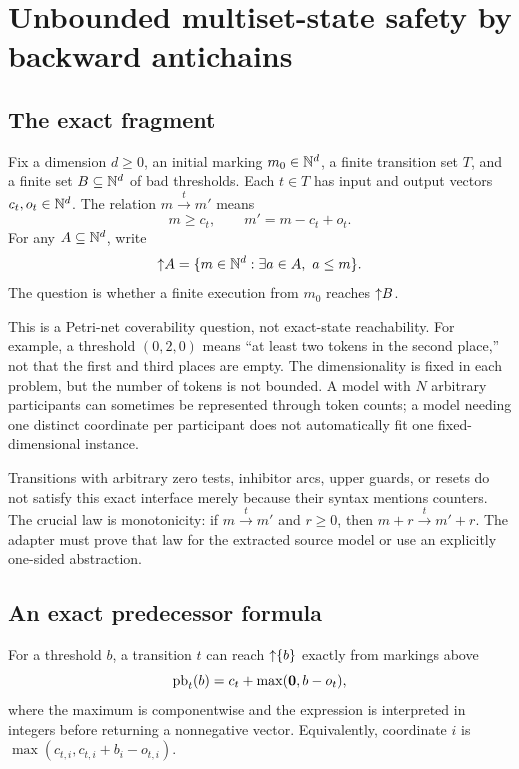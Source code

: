 \section{Unbounded multiset-state safety by backward antichains}
\label{sec:petri}

\subsection{The exact fragment}
\begin{definition}
Fix a dimension $d\ge0$, an initial marking $m_0\in\mathbb N^d$, a finite transition set $T$, and a finite set $B\subseteq\mathbb N^d$ of bad thresholds. Each $t\in T$ has input and output vectors $c_t,o_t\in\mathbb N^d$. The relation $m\xrightarrow{t}m'$ means
\[
 m\ge c_t,\qquad m'=m-c_t+o_t.
\]
For any $A\subseteq\mathbb N^d$, write
\[
 \mathord{\uparrow}A=\{m\in\mathbb N^d:\exists a\in A,\ a\le m\}.
\]
The question is whether a finite execution from $m_0$ reaches $\mathord{\uparrow}B$.
\end{definition}

This is a Petri-net coverability question, not exact-state reachability. For example, a threshold $(0,2,0)$ means ``at least two tokens in the second place,'' not that the first and third places are empty. The dimensionality is fixed in each problem, but the number of tokens is not bounded. A model with $N$ arbitrary participants can sometimes be represented through token counts; a model needing one distinct coordinate per participant does not automatically fit one fixed-dimensional instance.

Transitions with arbitrary zero tests, inhibitor arcs, upper guards, or resets do not satisfy this exact interface merely because their syntax mentions counters. The crucial law is monotonicity: if $m\xrightarrow{t}m'$ and $r\ge0$, then $m+r\xrightarrow{t}m'+r$. The adapter must prove that law for the extracted source model or use an explicitly one-sided abstraction.

\subsection{An exact predecessor formula}
For a threshold $b$, a transition $t$ can reach $\mathord{\uparrow}\{b\}$ exactly from markings above
\begin{equation}
 \label{eq:pb}
 \operatorname{pb}_t(b)=c_t+\max(\mathbf 0,b-o_t),
\end{equation}
where the maximum is componentwise and the expression is interpreted in integers before returning a nonnegative vector. Equivalently, coordinate $i$ is $\max(c_{t,i},c_{t,i}+b_i-o_{t,i})$.

